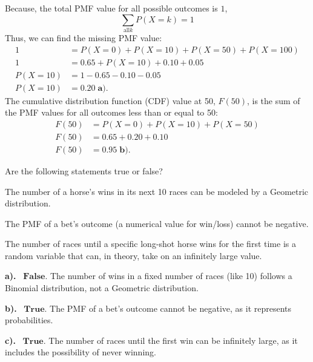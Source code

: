 \documentclass[a4paper, 10pt]{article}
\begin{document}
\begin{solution}
	Because, the total PMF value for all possible outcomes is \( 1 \),
	\[
		\sum_{\text{all} k} P(X = k) = 1
	\]
	Thus, we can find the missing PMF value:
	\begin{align*}
		1         & = P(X = 0) + P(X = 10) + P(X = 50) + P(X = 100) \\
		1         & = 0.65 + P(X = 10) + 0.10 + 0.05                \\
		P(X = 10) & = 1 - 0.65 - 0.10 - 0.05                        \\
		P(X = 10) & = \boxed{0.20} \; \textbf{a).}
	\end{align*}
	The cumulative distribution function (CDF) value at 50, \( F(50) \),
	is the sum of the PMF values for all outcomes less than or equal to 50:
	\begin{align*}
		F(50) & = P(X = 0) + P(X = 10) + P(X = 50) \\
		F(50) & = 0.65 + 0.20 + 0.10               \\
		F(50) & = \boxed{0.95} \; \textbf{b).}
	\end{align*}
\end{solution}

\pagebreak

\begin{problem}
Are the following statements true or false?
\begin{subproblems_alpha}
	\item The number of a horse's wins in its next 10 races can be modeled by a Geometric distribution.
	\item The PMF of a bet's outcome (a numerical value for win/loss) cannot be negative.
	\item The number of races until a specific long-shot horse wins for the first time is a random variable that can,
	in theory, take on an infinitely large value.
\end{subproblems_alpha}
\end{problem}

\begin{solution}
	\par\noindent\textbf{a).} \, \( \boxed{\textbf{False.}} \) The number of wins in a fixed number of races (like 10) follows a Binomial distribution, not a Geometric distribution.
	\par\noindent\textbf{b).} \, \( \boxed{\textbf{True.}} \) The PMF of a bet's outcome cannot be negative, as it represents probabilities.
	\par\noindent\textbf{c).} \, \( \boxed{\textbf{True.}} \) The number of races until the first win can be infinitely large, as it includes the possibility of never winning.
\end{solution}
\end{document}

